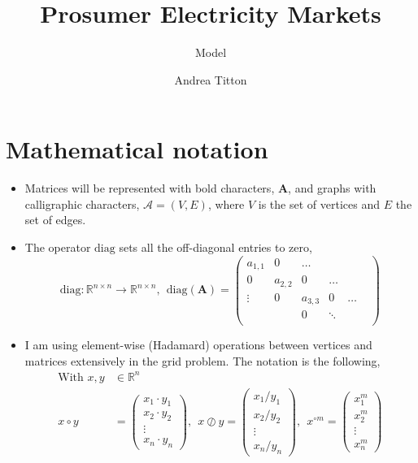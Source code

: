 \documentclass[american]{scrartcl}
\title{
        Prosumer Electricity Markets
    }
\subtitle{Model}
\author{Andrea Titton}
\newcommand{\R}{\mathbb{R}}
\newcommand{\matr}[1]{\bm{#1}}
\newcommand{\diag}{\text{diag}}
\begin{document}
\nocite{*}
\maketitle

\tableofcontents
\newpage

\section*{Mathematical notation}

\begin{itemize}

	\item Matrices will be represented with bold characters, $\matr{A}$, and graphs with calligraphic characters, $\mathcal{A} = (V, E)$, where $V$ is the set of vertices and $E$ the set of edges.

	\item The operator $\diag$ sets all the off-diagonal entries to zero, \begin{equation*}
		      \diag: \R^{n \times n} \to \R^{n \times n}, \ \ \diag(\matr{A}) = \begin{pmatrix}
			      a_{1, 1} & 0        & \ldots   &                   \\
			      0        & a_{2, 2} & 0        & \ldots &          \\
			      \vdots   & 0        & a_{3, 3} & 0      & \ldots   \\
			               &          & 0        & \ddots &        & \\
		      \end{pmatrix}
	      \end{equation*}

	\item I am using element-wise (Hadamard) operations between vertices and matrices extensively in the grid problem. The notation is the following, \begin{equation}
		      \begin{split}
			      \text{With }x, y &\in \R^n \\
			      x \circ y &= \begin{pmatrix}
				      x_1 \cdot y_1 \\ x_2 \cdot y_2 \\ \vdots \\ x_n \cdot y_n
			      \end{pmatrix}, \ \
			      x \oslash y = \begin{pmatrix}
				      x_1 / y_1 \\ x_2 / y_2 \\ \vdots \\ x_n / y_n
			      \end{pmatrix}, \ \
			      x^{\circ m} = \begin{pmatrix}
				      x_1^m \\ x_2^m \\ \vdots \\ x_n^m
			      \end{pmatrix}
		      \end{split}
	      \end{equation}

\end{itemize}
\end{document}
